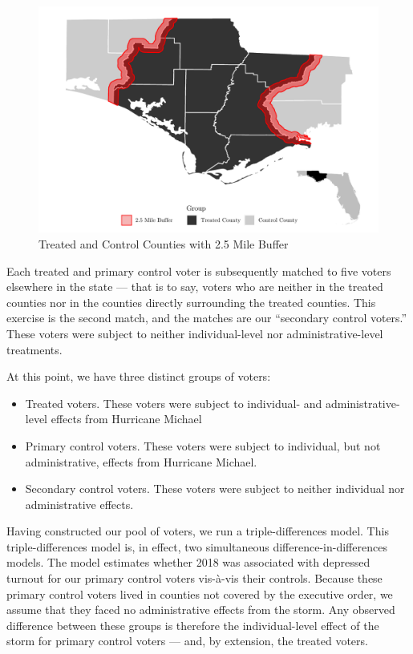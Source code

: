 \documentclass[
  12pt,
]{article}
\providecommand{\tightlist}{%
  \setlength{\itemsep}{0pt}\setlength{\parskip}{0pt}}
\begin{document}
\begin{figure}[h]

{\centering \includegraphics{hurricane_michael_files/figure-latex/map-chunk-1} 

}

\caption{\label{fig:map}Treated and Control Counties with 2.5 Mile Buffer}\label{fig:map-chunk}
\end{figure}

Each treated and primary control voter is subsequently matched to five voters elsewhere in the state --- that is to say, voters who are neither in the treated counties nor in the counties directly surrounding the treated counties. This exercise is the second match, and the matches are our ``secondary control voters.'' These voters were subject to neither individual-level nor administrative-level treatments.

At this point, we have three distinct groups of voters:

\begin{itemize}
\tightlist
\item
  Treated voters. These voters were subject to individual- and administrative-level effects from Hurricane Michael
\item
  Primary control voters. These voters were subject to individual, but not administrative, effects from Hurricane Michael.
\item
  Secondary control voters. These voters were subject to neither individual nor administrative effects.
\end{itemize}

Having constructed our pool of voters, we run a triple-differences model. This triple-differences model is, in effect, two simultaneous difference-in-differences models. The model estimates whether 2018 was associated with depressed turnout for our primary control voters vis-à-vis their controls. Because these primary control voters lived in counties not covered by the executive order, we assume that they faced no administrative effects from the storm. Any observed difference between these groups is therefore the individual-level effect of the storm for primary control voters --- and, by extension, the treated voters.
\end{document}
